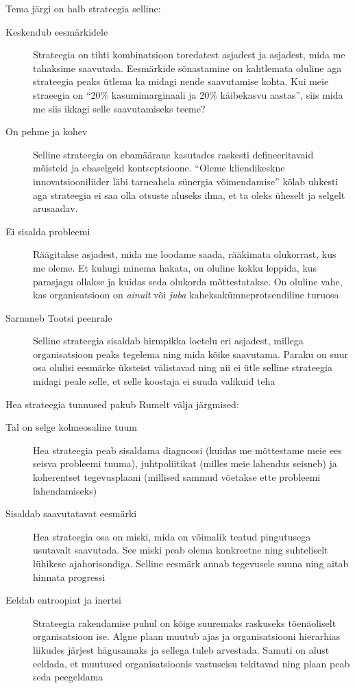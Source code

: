 \documentclass{tufte-book}
\begin{document}
Tema järgi on halb strateegia selline:
\begin{description}
	\item[Keskendub eesmärkidele] Strateegia on tihti kombinatsioon toredatest asjadest ja asjadest, mida me tahaksime saavutada. Eesmärkide sõnastamine on kahtlemata oluline aga strateegia peaks ütlema ka midagi nende saavutamise kohta. Kui meie straeegia on \enquote{20\% kasumimarginaali ja 20\% käibekasvu aastas}, siis mida me siis ikkagi selle saavutamiseks teeme?
	\item[On pehme ja kohev] Selline strateegia on ebamäärane kasutades raskesti defineeritavaid mõisteid ja ebaselgeid kontseptsioone. \enquote{Oleme kliendikeskne innovatsiooniliider läbi tarneahela sünergia võimendamise} kõlab uhkesti aga strateegia ei saa olla otsuste aluseks ilma, et ta oleks üheselt ja selgelt arusaadav. 
	\item[Ei sisalda probleemi] Räägitakse asjadest, mida me loodame saada, rääkimata olukorrast, kus me oleme. Et kuhugi minema hakata, on oluline kokku leppida, kus parasjagu ollakse ja kuidas seda olukorda mõttestatakse. On oluline vahe, kas organisatsioon on \emph{ainult} või \emph{juba} kaheksakümneprotsendiline turuosa
	\item[Sarnaneb Tootsi peenrale] Selline strateegia sisaldab hirmpikka loetelu eri asjadest, millega organisatsioon peaks tegelema ning mida kõike saavutama. Paraku on suur osa olulisi eesmärke üksteist välistavad ning nii ei ütle selline strateegia midagi peale selle, et selle koostaja ei suuda valikuid teha
\end{description}

Hea strateegia tunnused pakub Rumelt välja järgmised:
\begin{description}
	\item[Tal on selge kolmeosaline tuum] Hea strateegia peab sisaldama diagnoosi (kuidas me mõttestame meie ees seisva probleemi tuuma), juhtpoliitikat (milles meie lahendus seisneb) ja koherentset tegevusplaani (millised sammud võetakse ette probleemi lahendamiseks)
	\item[Sisaldab saavutatavat eesmärki] Hea strateegia osa on miski, mida on võimalik teatud pingutusega usutavalt saavutada. See miski peab olema konkreetne ning suhteliselt lühikese ajahorisondiga. Selline eesmärk annab tegevusele suuna ning aitab hinnata progressi
	\item[Eeldab entroopiat ja inertsi] Strateegia rakendamise puhul on kõige suuremaks raskuseks tõenäoliselt organisatsioon ise. Algne plaan muutub ajas ja organisatsiooni hierarhias liikudes järjest hägusamaks ja sellega tuleb arvestada. Samuti on alust eeldada, et muutused organisatsioonis vastuseisu tekitavad ning plaan peab seda peegeldama
\end{description}
\end{document}
